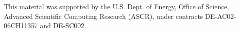 \begin{acks}
This material was supported by the U.S. Dept. of Energy, Office
of Science, Advanced Scientific Computing Research (ASCR), under contracts DE-AC02-06CH11357 and DE-SC002.
\end{acks}